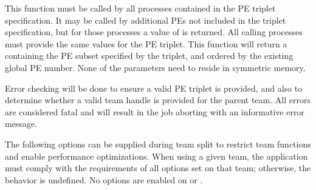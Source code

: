 \begin{apidefinition}
{This function must be called by all processes contained in the \ac{PE} triplet
specification. It may be called by additional \acp{PE} not included in the
triplet specification, but for those processes a  value of
 is returned. All calling processes must provide the
same values for the \ac{PE} triplet. This function will return a 
containing the \ac{PE} subset specified by the triplet, and ordered by the
existing global \ac{PE} number. None of the parameters need to reside in
symmetric memory.

Error checking will be done to ensure a valid \ac{PE} triplet is provided,
and also to determine whether a valid team handle is provided for the
parent team. All errors are considered fatal and will result in the job aborting with
an informative error message.

The following options can be supplied during team split to restrict
team functions and enable performance optimizations.  When using a given
team, the application must comply with the requirements of all options
set on that team; otherwise, the behavior is undefined.
No options are enabled on  or .

}



\begin{apiexamples}

\end{apiexamples}

\end{apidefinition}
